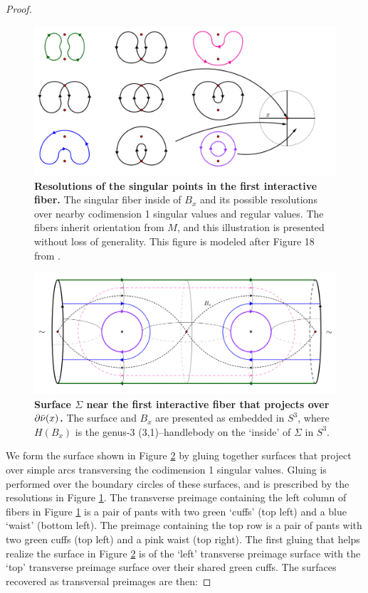 \begin{proof}
	\begin{figure}[h!]
		\centering
		\includegraphics[width=\textwidth]{figures/codim-2-interactive-fiber-1.png}
		\caption{
			\textbf{Resolutions of the singular points in the first interactive fiber.}
			The singular fiber inside of $B_x$ and its possible resolutions over nearby codimension 1 singular values and regular values.
			The fibers inherit orientation from $M$, and this illustration is presented without loss of generality.
			This figure is modeled after Figure 18 from \cite{CostThur08}.
		}
		\label{fig:codim-2-interactive-fiber-1}
	\end{figure}

	\begin{figure}[h!]
	\centering
	\includegraphics[width=\textwidth]{figures/codim-2-surface-1.png}
	\caption{
		\textbf{Surface $\Sigma$ near the first interactive fiber that projects over $\partial\bar\nu(x)$.}
		The surface and $B_x$ are presented as embedded in $S^3$, where $H(B_x)$ is the genus-3 (3,1)--handlebody on the `inside' of $\Sigma$ in $S^3$.
	}
	\label{fig:codim-2-surface-1}
	\end{figure}

	We form the surface shown in Figure \ref{fig:codim-2-surface-1} by gluing together surfaces that project over simple arcs transversing the codimension 1 singular values.
	Gluing is performed over the boundary circles of these surfaces, and is prescribed by the resolutions in Figure \ref{fig:codim-2-interactive-fiber-1}.
	The transverse preimage containing the left column of fibers in Figure \ref{fig:codim-2-interactive-fiber-1} is a pair of pants with two green `cuffs' (top left) and a blue `waist' (bottom left).
	The preimage containing the top row is a pair of pants with two green cuffs (top left) and a pink waist (top right).
	The first gluing that helps realize the surface in Figure \ref{fig:codim-2-surface-1} is of the `left' transverse preimage surface with the `top' transverse preimage surface over their shared green cuffs.
	The surfaces recovered as transversal preimages are then:
	

\end{proof}
